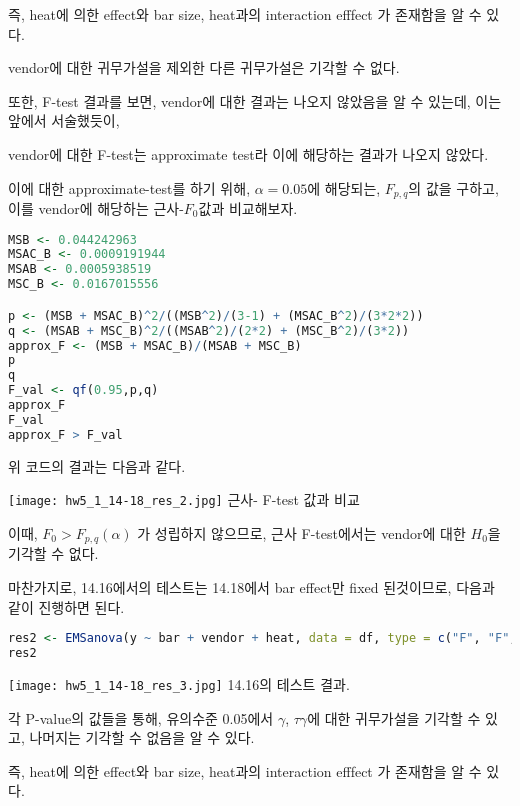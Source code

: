 \documentclass{article}
\begin{document}
즉, heat에 의한 effect와 bar size, heat과의 interaction efffect 가 존재함을 알 수 있다.

vendor에 대한 귀무가설을 제외한 다른 귀무가설은 기각할 수 없다.

또한, F-test 결과를 보면, vendor에 대한 결과는 나오지 않았음을 알 수 있는데, 이는 앞에서 서술했듯이,

vendor에 대한 F-test는 approximate test라 이에 해당하는 결과가 나오지 않았다.

이에 대한 approximate-test를 하기 위해, $\alpha = 0.05$에 해당되는, $F_{p,q}$의 값을 구하고, 이를 vendor에 해당하는 근사-$F_0$값과 비교해보자.

\begin{lstlisting}[language=R]
MSB <- 0.044242963
MSAC_B <- 0.0009191944
MSAB <- 0.0005938519
MSC_B <- 0.0167015556

p <- (MSB + MSAC_B)^2/((MSB^2)/(3-1) + (MSAC_B^2)/(3*2*2))
q <- (MSAB + MSC_B)^2/((MSAB^2)/(2*2) + (MSC_B^2)/(3*2))
approx_F <- (MSB + MSAC_B)/(MSAB + MSC_B)
p
q
F_val <- qf(0.95,p,q)
approx_F
F_val
approx_F > F_val
\end{lstlisting}

위 코드의 결과는 다음과 같다.

\begin{center}
    \texttt{[image: hw5\_1\_14-18\_res\_2.jpg]}
근사- F-test 값과 비교
\end{center} 

이때, $F_0 > F_{p,q}(\alpha)$ 가 성립하지 않으므로, 근사 F-test에서는 vendor에 대한 $H_0$을 기각할 수 없다.




마찬가지로, 14.16에서의 테스트는 14.18에서 bar effect만 fixed 된것이므로, 다음과 같이 진행하면 된다.


\begin{lstlisting}[language=R]
res2 <- EMSanova(y ~ bar + vendor + heat, data = df, type = c("F", "F", "R"), nested = c(NA, NA, "vendor"))
res2
\end{lstlisting}

\begin{center}
    \texttt{[image: hw5\_1\_14-18\_res\_3.jpg]}
14.16의 테스트 결과.
\end{center} 

각 P-value의 값들을 통해, 유의수준 0.05에서 $\gamma$, $\tau \gamma$에 대한 귀무가설을 기각할 수 있고, 나머지는 기각할 수 없음을 알 수 있다.

즉, heat에 의한 effect와 bar size, heat과의 interaction efffect 가 존재함을 알 수 있다.
\end{document}

